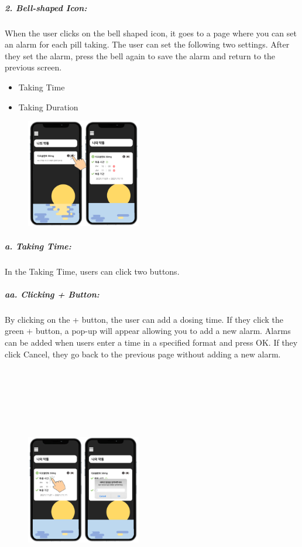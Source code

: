 \documentclass[conference]{IEEEtran}
\begin{document}
\subparagraph{2. Bell-shaped Icon:}
When the user clicks on the bell shaped icon, it goes to a page where you can set an alarm for each pill taking. The user can set the following two settings. After they set the alarm, press the bell again to save the alarm and return to the previous screen. \\

\begin{itemize}
  \item Taking Time
  \item Taking Duration\\
\end{itemize}

\begin{figure}[h!]
\centering
\includegraphics[width=5cm]{final_image_folder/click_pillbox_alarm.png}
\caption{}
\label{fig:map}
\end{figure}

\subparagraph{a. Taking Time: }
In the Taking Time, users can click two buttons. \\

\subparagraph{aa. Clicking + Button: }
By clicking on the + button, the user can add a dosing time. If they click the green + button, a pop-up will appear allowing you to add a new alarm. Alarms can be added when users enter a time in a specified format and press OK. If they click Cancel, they go back to the previous page without adding a new alarm.  \\
\\
\\
\\
\\
\\
\\

\begin{figure}[t!]
\centering
\includegraphics[width=5cm]{final_image_folder/click_pillbox_alarm_add.png}
\caption{}
\label{fig:map}
\end{figure}
\end{document}
